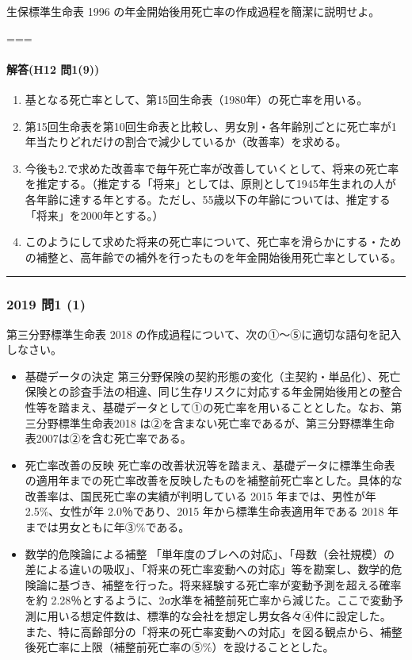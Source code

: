 \documentclass[]{article}
\begin{document}
生保標準生命表 1996 の年金開始後用死亡率の作成過程を簡潔に説明せよ。

===

\hypertarget{ux89e3ux7b54h12-ux554f19}{%
\paragraph{解答(H12 問1(9))}\label{ux89e3ux7b54h12-ux554f19}}

\begin{enumerate}
\def\labelenumi{\arabic{enumi}.}
\tightlist
\item
  基となる死亡率として、第15回生命表（1980年）の死亡率を用いる。
\item
  第15回生命表を第10回生命表と比較し、男女別・各年齢別ごとに死亡率が1年当たりどれだけの割合で減少しているか（改善率）を求める。
\item
  今後も2.で求めた改善率で毎午死亡率が改善していくとして、将来の死亡率を推定する。（推定する「将来」としては、原則として1945年生まれの人が各年齢に達する年とする。ただし、55歳以下の年齢については、推定する「将来」を2000年とする。）
\item
  このようにして求めた将来の死亡率について、死亡率を滑らかにする・ための補整と、高年齢での補外を行ったものを年金開始後用死亡率としている。
\end{enumerate}

\begin{center}\rule{0.5\linewidth}{0.5pt}\end{center}

\hypertarget{ux554f1-1}{%
\subsubsection{2019 問1 (1)}\label{ux554f1-1}}

第三分野標準生命表 2018
の作成過程について、次の①～⑤に適切な語句を記入しなさい。

\begin{itemize}
\tightlist
\item
  基礎データの決定
  第三分野保険の契約形態の変化（主契約・単品化）、死亡保険との診査手法の相違、同じ生存リスクに対応する年金開始後用との整合性等を踏まえ、基礎データとして①の死亡率を用いることとした。なお、第三分野標準生命表2018
  は②を含まない死亡率であるが、第三分野標準生命表2007は②を含む死亡率である。
\item
  死亡率改善の反映
  死亡率の改善状況等を踏まえ、基礎データに標準生命表の適用年までの死亡率改善を反映したものを補整前死亡率とした。具体的な改善率は、国民死亡率の実績が判明している
  2015 年までは、男性が年 2.5\%、女性が年 2.0％であり、2015
  年から標準生命表適用年である 2018 年までは男女ともに年③\%である。
\item
  数学的危険論による補整
  「単年度のブレヘの対応」、「母数（会社規模）の差による違いの吸収」、「将来の死亡率変動への対応」等を勘案し、数学的危険論に基づき、補整を行った。将来経験する死亡率が変動予測を超える確率を約
  2.28％とするように、2σ水準を補整前死亡率から減じた。ここで変動予測に用いる想定件数は、標準的な会社を想定し男女各々④件に設定した。
  また、特に高齢部分の「将来の死亡率変動への対応」を図る観点から、補整後死亡率に上限（補整前死亡率の⑤\%）を設けることとした。
\end{itemize}
\end{document}
